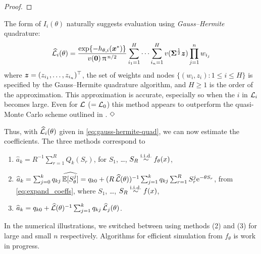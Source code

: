 \begin{subappendices}
\begin{proof}
\end{proof}


\begin{remark}
The form of $I_i(\theta)$ naturally suggests evaluation using \emph{Gauss--Hermite} quadrature:
\begin{equation} \label{eq:gauss-hermite-quad}
	\widehat{\mathcal{L}}_i(\theta) = \frac{\exp\{-h_{\theta,i}(\bm{x}^*)\}}{v(\bm{0}) \,\uppi^{\,n/2}} \sum_{i_1=1}^H \cdots \sum_{i_n=1}^H v(\bm{\Sigma}^{\frac12} \bm{z})  \prod_{j=1}^n w_{i_j}
\end{equation}
where $\bm{z} = (z_{i_1}, \dots, z_{i_n})^\top$, the set of weights and nodes $\{(w_i, z_i) : 1 \le i \le H\}$ is specified by the Gauss--Hermite quadrature algorithm, and $H \ge 1$ is the order of the approximation. This approximation is accurate, especially so when the $i$ in $\mathcal{L}_i$ becomes large. Even for $\mathcal{L}$ ($= \mathcal{L}_0$) this method appears to outperform the quasi-Monte Carlo scheme outlined in \cite{La15}. $\hfill \Diamond$
\end{remark}

Thus, with $\widehat{\mathcal{L}}_i(\theta)$ given in \eqref{eq:gauss-hermite-quad}, we can now estimate the coefficients. The three methods correspond to
\begin{enumerate}
\item $\widehat{a}_k = R^{-1} \sum_{r=1}^R Q_k(S_r)$, for $S_1$, \dots, $S_R \overset{\mathrm{i.i.d.}}{\sim} f_\theta(x)$,
\item $\widehat{a}_k = \sum_{j=0}^k q_{kj} \, \widehat{\operatorname{{\mathbb E}}[S_\theta^j]} = q_{k0} + (R \, \widehat{\mathcal{L}}(\theta))^{-1} \sum_{j=1}^k q_{kj} \sum_{r=1}^R S_r^j \mathrm{e}^{-\theta S_r}$, from \eqref{eq:expand_coeffs}, where $S_1$, \dots, $S_R \overset{\mathrm{i.i.d.}}{\sim} f(x)$,
\item $\widehat{a}_k = q_{k0} + \widehat{\mathcal{L}}(\theta)^{-1} \sum_{j=1}^k q_{kj} \, \widehat{\mathcal{L}}_j(\theta)$.
\end{enumerate}
In the numerical illustrations, we switched between using methods (2) and (3) for large and small $n$ respectively. Algorithms for efficient simulation from $f_\theta$ is work in progress.


\end{subappendices}
